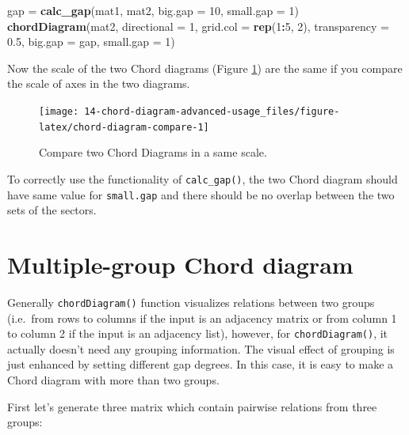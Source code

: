 \documentclass[]{book}
\newenvironment{Shaded}{\begin{snugshade}}{\end{snugshade}}
\newcommand{\KeywordTok}[1]{\textcolor[rgb]{0.13,0.29,0.53}{\textbf{#1}}}
\newcommand{\DataTypeTok}[1]{\textcolor[rgb]{0.13,0.29,0.53}{#1}}
\newcommand{\DecValTok}[1]{\textcolor[rgb]{0.00,0.00,0.81}{#1}}
\newcommand{\FloatTok}[1]{\textcolor[rgb]{0.00,0.00,0.81}{#1}}
\newcommand{\StringTok}[1]{\textcolor[rgb]{0.31,0.60,0.02}{#1}}
\newcommand{\OperatorTok}[1]{\textcolor[rgb]{0.81,0.36,0.00}{\textbf{#1}}}
\newcommand{\NormalTok}[1]{#1}
\begin{document}
\begin{Shaded}
\begin{Highlighting}[]
\NormalTok{gap =}\StringTok{ }\KeywordTok{calc_gap}\NormalTok{(mat1, mat2, }\DataTypeTok{big.gap =} \DecValTok{10}\NormalTok{, }\DataTypeTok{small.gap =} \DecValTok{1}\NormalTok{)}
\KeywordTok{chordDiagram}\NormalTok{(mat2, }\DataTypeTok{directional =} \DecValTok{1}\NormalTok{, }\DataTypeTok{grid.col =} \KeywordTok{rep}\NormalTok{(}\DecValTok{1}\OperatorTok{:}\DecValTok{5}\NormalTok{, }\DecValTok{2}\NormalTok{), }\DataTypeTok{transparency =} \FloatTok{0.5}\NormalTok{,}
    \DataTypeTok{big.gap =}\NormalTok{ gap, }\DataTypeTok{small.gap =} \DecValTok{1}\NormalTok{)}
\end{Highlighting}
\end{Shaded}

Now the scale of the two Chord diagrams (Figure
\ref{fig:chord-diagram-compare}) are the same if you compare the scale
of axes in the two diagrams.

\begin{figure}

{\centering \texttt{[image: 14-chord-diagram-advanced-usage\_files/figure-latex/chord-diagram-compare-1]} 

}

\caption{Compare two Chord Diagrams in a same scale.}\label{fig:chord-diagram-compare}
\end{figure}

To correctly use the functionality of \texttt{calc\_gap()}, the two
Chord diagram should have same value for \texttt{small.gap} and there
should be no overlap between the two sets of the sectors.

\section{Multiple-group Chord
diagram}\label{multiple-group-chord-diagram}

Generally \texttt{chordDiagram()} function visualizes relations between
two groups (i.e.~from rows to columns if the input is an adjacency
matrix or from column 1 to column 2 if the input is an adjacency list),
however, for \texttt{chordDiagram()}, it actually doesn't need any
grouping information. The visual effect of grouping is just enhanced by
setting different gap degrees. In this case, it is easy to make a Chord
diagram with more than two groups.

First let's generate three matrix which contain pairwise relations from
three groups:
\end{document}
